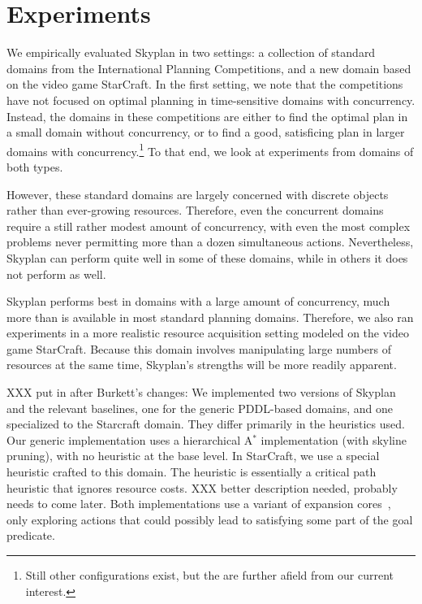 \documentclass[letterpaper]{article}
\theoremstyle{plain} \newtheorem{theorem}{Theorem} \newtheorem{proposition}{Proposition} \newtheorem{lemma}{Lemma}
\theoremstyle{definition} \newtheorem{definition}{Definition} \newtheorem{conjecture}{Conjecture} \newtheorem*{example}{Example}
\theoremstyle{remark} \newtheorem*{remark}{Remark} \newtheorem*{note}{Note} \newtheorem{case}{Case}
\newcommand{\Astar}{A$^*$ }
\begin{document}
\section{Experiments}



We empirically evaluated Skyplan in two settings: a collection of standard domains from the International Planning Competitions, and a new domain based on the video game StarCraft. In the first setting, we note that the competitions have not focused on optimal planning in time-sensitive domains with concurrency. Instead, the domains in these competitions are either to find the optimal plan in a small domain without concurrency, or to find a good, satisficing plan in larger domains with concurrency.\footnote{Still other configurations exist, but the are further afield from our current interest.} To that end, we look at experiments from domains of both types. 

However, these standard domains are largely concerned with discrete objects
rather than ever-growing resources. Therefore, even the concurrent domains
require a still rather modest amount of concurrency, with even the most complex
problems never permitting more than a dozen simultaneous actions. Nevertheless, Skyplan can perform quite well in some of these domains, while in others it does not perform as well.

Skyplan performs best in domains with a large amount of concurrency, much more
than is available in most standard planning domains. Therefore, we also ran
experiments in a more realistic resource acquisition setting modeled on the
video game StarCraft. Because this domain involves manipulating large numbers
of resources at the same time, Skyplan's strengths will be more readily
apparent.

XXX put in after Burkett's changes:
We implemented two versions of Skyplan and the relevant baselines, one for the generic PDDL-based domains, and one specialized to the Starcraft domain. They differ primarily in the heuristics used. Our generic implementation uses a hierarchical \Astar implementation (with skyline pruning), with no heuristic at the base level.  In StarCraft, we use a special heuristic crafted to this domain. The heuristic is essentially a critical path heuristic that ignores resource costs. XXX better description needed, probably needs to come later.
 Both implementations use a variant of expansion cores~\citep{chen09completeness, xu11theory}, only exploring actions that could possibly lead to satisfying some part of the goal predicate.
\end{document}
